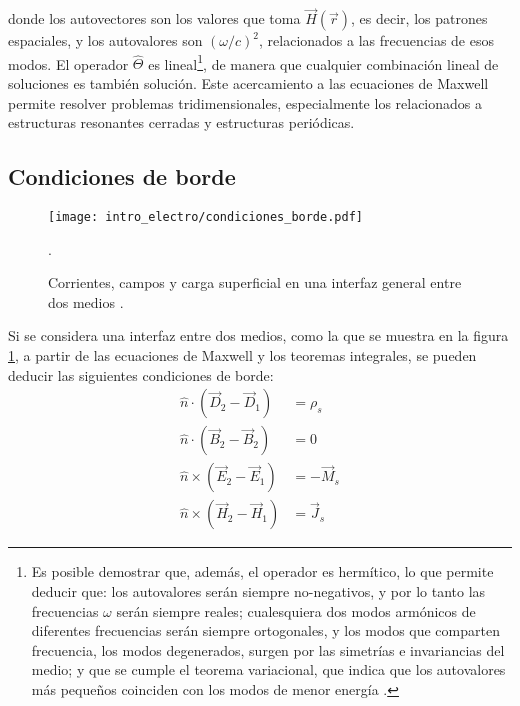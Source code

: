 donde los autovectores son los valores que toma $\vec{H}(\vec{r})$, es decir, los patrones espaciales, y los autovalores son $(\omega/c)^2$, relacionados a las frecuencias de esos modos. El operador $\hat{\Theta}$ es lineal\footnote{Es posible demostrar que, además, el operador es hermítico, lo que permite deducir que: los autovalores serán siempre no-negativos, y por lo tanto las frecuencias $\omega$ serán siempre reales; cualesquiera dos modos armónicos de diferentes frecuencias serán siempre ortogonales, y los modos que comparten frecuencia, los modos degenerados, surgen por las simetrías e invariancias del medio; y que se cumple el teorema variacional, que indica que los autovalores más pequeños coinciden con los modos de menor energía \cite{Joannopoulos:PhotonicCrystals}.}, de manera que cualquier combinación lineal de soluciones es también solución. Este acercamiento a las ecuaciones de Maxwell permite resolver problemas tridimensionales, especialmente los relacionados a estructuras resonantes cerradas y estructuras periódicas.

\subsection{Condiciones de borde} \label{sec:condiciones-borde}

\begin{figure}[htp]
	\centering
	\texttt{[image: intro\_electro/condiciones\_borde.pdf]}
	\caption{Corrientes, campos y carga superficial en una interfaz general entre dos medios \cite{Pozar:MwEngineering}.}.
	\label{fig:condiciones_borde}
\end{figure}

Si se considera una interfaz entre dos medios, como la que se muestra en la figura \ref{fig:condiciones_borde}, a partir de las ecuaciones de Maxwell y los teoremas integrales, se pueden deducir las siguientes condiciones de borde:
\begin{subequations}
	\label{eq:condiciones_borde}
	\begin{align}
		\hat{n} \cdot (\vec{D}_{2} - \vec{D}_{1}) & = \rho_s \\
		\hat{n} \cdot (\vec{B}_{2} - \vec{B}_{2}) & = 0 \\
		\hat{n} \times (\vec{E}_2 - \vec{E}_1)  & = - \vec{M}_s \\
		\hat{n} \times (\vec{H}_2 - \vec{H}_1) & = \vec{J}_s
	\end{align}
\end{subequations}

